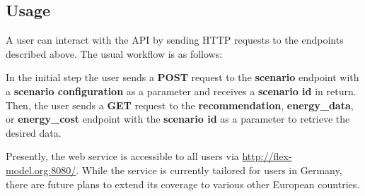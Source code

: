 \subsection{Usage}

A user can interact with the API by sending HTTP requests to the endpoints described above.
The usual workflow is as follows:

In the initial step the user sends a \textbf{POST} request to the \textbf{scenario} endpoint with a \textbf{scenario configuration} as a parameter
and receives a \textbf{scenario id} in return.
Then, the user sends a \textbf{GET} request to the \textbf{recommendation}, \textbf{energy\_data}, or \textbf{energy\_cost} endpoint with the \textbf{scenario id} as a parameter
to retrieve the desired data.

Presently, the web service is accessible to all users via \url{http://flex-model.org:8080/}. 
While the service is currently tailored for users in Germany, there are future plans to extend its coverage to various other European countries. 